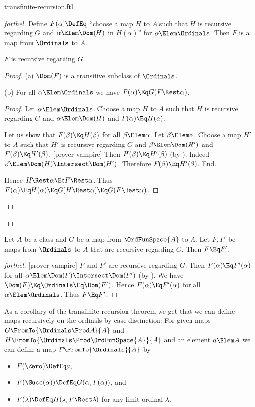 \documentclass{stex}
\begin{document}
\begin{smodule}{transfinite-recursion.ftl}
\begin{proof}[forthel]
  Define $F(\alpha) \DefEq$ ``choose a map $H$ to $A$ such that $H$ is recursive regarding $G$ and $\alpha \Elem \Dom(H)$ in $H(\alpha)$'' for $\alpha \Elem \Ordinals$.
  Then $F$ is a map from $\Ordinals$ to $A$.

  $F$ is recursive regarding $G$.
  \begin{proof}
    (a) $\Dom(F)$ is a transitive subclass of $\Ordinals$.

    (b) For all $\alpha \Elem \Ordinals$ we have $F(\alpha) \Eq G(F \Rest \alpha)$.
    \begin{proof}
      Let $\alpha \Elem \Ordinals$.
      Choose a map $H$ to $A$ such that $H$ is recursive regarding $G$ and $\alpha \Elem \Dom(H)$ and $F(\alpha) \Eq H(\alpha)$.

      Let us show that $F(\beta) \Eq H(\beta)$ for all $\beta \Elem \alpha$.
        Let $\beta \Elem \alpha$.
        Choose a map $H'$ to $A$ such that $H'$ is recursive regarding $G$ and $\beta \Elem \Dom(H')$ and $F(\beta) \Eq H'(\beta)$.
        [prover vampire]
        Then $H(\beta) \Eq H'(\beta)$ (by ).
        Indeed $\beta \Elem \Dom(H) \Intersect \Dom(H')$.
        Therefore $F(\beta) \Eq H'(\beta)$.
      End.

      Hence $H \Rest \alpha \Eq F \Rest \alpha$.
      Thus $F(\alpha)
        \Eq H(\alpha)
        \Eq G(H \Rest \alpha)
        \Eq G(F \Rest \alpha)$.
    \end{proof}
  \end{proof}
\end{proof}

\begin{theorem}[forthel,title=Transfinite Recursion: Uniqueness]
  Let $A$ be a class and $G$ be a map from $\OrdFunSpace{A}$ to $A$.
  Let $F, F'$ be maps from $\Ordinals$ to $A$ that are recursive regarding $G$.
  Then $F \Eq F'$.
\end{theorem}
\begin{proof}[forthel]
  [prover vampire]
  $F$ and $F'$ are recursive regarding $G$.
  Then $F(\alpha) \Eq F'(\alpha)$ for all $\alpha \Elem \Dom(F) \Intersect \Dom(F')$ (by ).
  We have $\Dom(F) \Eq \Ordinals \Eq \Dom(F')$.
  Hence $F(\alpha) \Eq F'(\alpha)$ for all $\alpha \Elem \Ordinals$.
  Thus $F \Eq F'$.
\end{proof}

As a corollary of the transfinite recursion theorem we get that we can
define maps recursively on the ordinals by case distinction:
For given maps $G \FromTo{\Ordinals \Prod A}{A}$ and
$H \FromTo{\Ordinals \Prod \OrdFunSpace{A}}{A}$ and an element $a \Elem A$ we
can define a map $F \FromTo{\Ordinals}{A}$ by
\begin{itemize}
  \item $F(\Zero) \DefEq a$,
  \item $F(\Succ(\alpha)) \DefEq G(\alpha, F(\alpha))$, and
  \item $F(\lambda) \DefEq H(\lambda, F \Rest \lambda)$
    for any limit ordinal $\lambda$.
\end{itemize}


\end{smodule}
\end{document}
